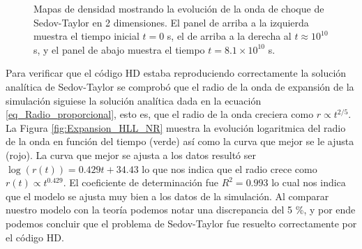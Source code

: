 \documentclass[12pt,a4paper]{book}
\begin{document}
\begin{figure}
    \caption{Mapas de densidad mostrando la evolución de la onda de choque de Sedov-Taylor en 2 dimensiones. El panel de arriba a la izquierda muestra el tiempo inicial $t=0$ s, el de arriba a la derecha al 
    $t \approx 10^{10}$ s, y el panel de abajo muestra el tiempo $t = 8.1 \times 10^{10}$ s.
    \label{fig:prueba_2d_newtoniana}}
\end{figure}

Para verificar que el código HD estaba reproduciendo correctamente la solución analítica de Sedov-Taylor se comprobó que el radio de la onda de expansión de la simulación siguiese la solución analítica 
dada en la ecuación \ref{eq_Radio_proporcional}, esto es, que el radio de la onda creciera como $r\propto t^{2/5}$. La Figura \ref{fig:Expansion_HLL_NR} muestra la evolución logaritmica del radio de la onda en función del tiempo (verde) así como 
la curva que mejor se le ajusta (rojo). La curva que mejor se ajusta a los datos resultó ser $\log(r(t))= 0.429t+34.43$ lo que nos indica que el radio crece como $r(t) \propto t^{0.429}$. El coeficiente de determinación fue $R^2= 0.993$ lo cual nos indica que el modelo se ajusta muy bien a 
los datos de la simulación. Al comparar nuestro modelo con la teoría podemos notar una discrepancia del 5 \%, y por ende podemos concluir que el problema de Sedov-Taylor fue resuelto correctamente por el código HD.
\end{document}
